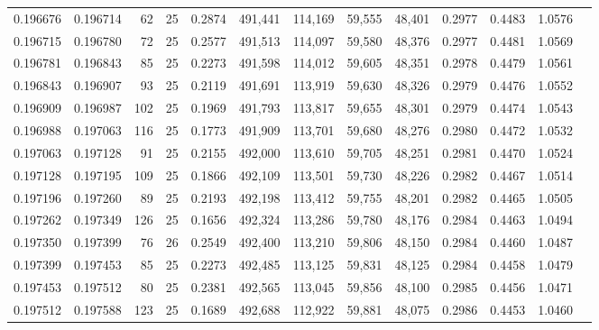 \begin{tabular}{rrrrrrrrrrrrr}
0.196676 & 0.196714 &    62 &  25 &                                     0.2874 & 491,441 & 114,169 &  59,555 &  48,401 & 0.2977 & 0.4483 & 1.0576 \\
0.196715 & 0.196780 &    72 &  25 &                                     0.2577 & 491,513 & 114,097 &  59,580 &  48,376 & 0.2977 & 0.4481 & 1.0569 \\
0.196781 & 0.196843 &    85 &  25 &                                     0.2273 & 491,598 & 114,012 &  59,605 &  48,351 & 0.2978 & 0.4479 & 1.0561 \\
0.196843 & 0.196907 &    93 &  25 &                                     0.2119 & 491,691 & 113,919 &  59,630 &  48,326 & 0.2979 & 0.4476 & 1.0552 \\
0.196909 & 0.196987 &   102 &  25 &                                     0.1969 & 491,793 & 113,817 &  59,655 &  48,301 & 0.2979 & 0.4474 & 1.0543 \\
0.196988 & 0.197063 &   116 &  25 &                                     0.1773 & 491,909 & 113,701 &  59,680 &  48,276 & 0.2980 & 0.4472 & 1.0532 \\
0.197063 & 0.197128 &    91 &  25 &                                     0.2155 & 492,000 & 113,610 &  59,705 &  48,251 & 0.2981 & 0.4470 & 1.0524 \\
0.197128 & 0.197195 &   109 &  25 &                                     0.1866 & 492,109 & 113,501 &  59,730 &  48,226 & 0.2982 & 0.4467 & 1.0514 \\
0.197196 & 0.197260 &    89 &  25 &                                     0.2193 & 492,198 & 113,412 &  59,755 &  48,201 & 0.2982 & 0.4465 & 1.0505 \\
0.197262 & 0.197349 &   126 &  25 &                                     0.1656 & 492,324 & 113,286 &  59,780 &  48,176 & 0.2984 & 0.4463 & 1.0494 \\
0.197350 & 0.197399 &    76 &  26 &                                     0.2549 & 492,400 & 113,210 &  59,806 &  48,150 & 0.2984 & 0.4460 & 1.0487 \\
0.197399 & 0.197453 &    85 &  25 &                                     0.2273 & 492,485 & 113,125 &  59,831 &  48,125 & 0.2984 & 0.4458 & 1.0479 \\
0.197453 & 0.197512 &    80 &  25 &                                     0.2381 & 492,565 & 113,045 &  59,856 &  48,100 & 0.2985 & 0.4456 & 1.0471 \\
0.197512 & 0.197588 &   123 &  25 &                                     0.1689 & 492,688 & 112,922 &  59,881 &  48,075 & 0.2986 & 0.4453 & 1.0460 \\

\end{tabular}
